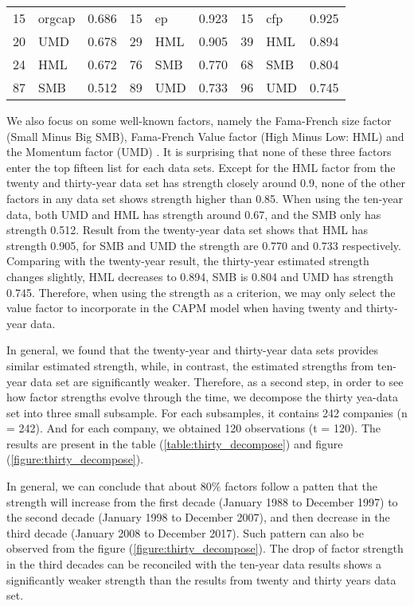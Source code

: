 \begin{table}[]
\begin{tabular}{llc|llc|llc}
		15 & orgcap         & 0.686    &15      & ep            & 0.923       &15     & cfp          & 0.925 \\ 
		20 & UMD            & 0.678    & 29     & HML        & 0.905      & 39     & HML       & 0.894 \\
		24 & HML            & 0.672    & 76     & SMB        & 0.770      & 68     & SMB        & 0.804 \\
		87 & SMB            & 0.512    & 89     & UMD        & 0.733      & 96     & UMD       & 0.745 \\ 
		\hline
	\end{tabular}
\end{table}

We also focus on some well-known factors, namely the Fama-French size factor (Small Minus Big SMB), Fama-French Value factor (High Minus Low: HML) \cite{Fama1992} and the Momentum factor (UMD) \cite{Carhart1997}.
It is surprising that none of these three factors enter the top fifteen list for each data sets.
Except for the HML factor from the twenty and thirty-year data set has strength closely around 0.9, none of the other factors in any data set shows strength higher than 0.85.
When using the ten-year data, both UMD and HML has strength around 0.67, and the SMB only has strength 0.512.
Result from the twenty-year data set shows that HML has strength 0.905, for SMB and UMD the strength are 0.770 and 0.733 respectively.
Comparing with the twenty-year result, the thirty-year estimated strength changes slightly, HML decreases to 0.894, SMB is 0.804 and UMD has strength 0.745.
Therefore, when using the strength as a criterion, we may only select the value factor to incorporate in the CAPM model when having twenty and thirty-year data.

In general, we found that the twenty-year and thirty-year data sets provides similar estimated strength, while, in contrast, the estimated strengths from ten-year data set are significantly weaker.
Therefore, as a second step, in order to see how factor strengths evolve through the time, we decompose the thirty yea-data set into three small subsample.
For each subsamples, it contains 242 companies (n = 242). 
And for each company, we obtained 120 observations (t = 120). 
The results are present in the table (\ref{table:thirty_decompose}) and figure (\ref{figure:thirty_decompose}).


In general, we can conclude that about 80\% factors follow a patten that the strength will increase from the first decade (January 1988 to December 1997) to the second decade (January 1998 to December 2007), and then decrease in the third decade (January 2008 to December 2017).
Such pattern can also be observed from the figure (\ref{figure:thirty_decompose}).
The drop of factor strength in the third decades can be reconciled with the ten-year data results shows a significantly weaker strength than the results from twenty and thirty years data set.

